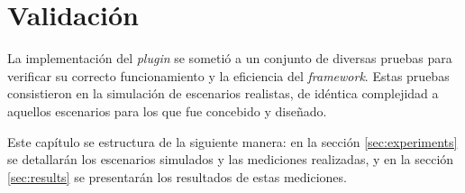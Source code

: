\chapter{Validación}\label{cap:validacion}

La implementación del \emph{plugin} se sometió a un conjunto de diversas pruebas para verificar su correcto funcionamiento y la eficiencia del \emph{framework}. Estas pruebas consistieron en la simulación de escenarios realistas, de idéntica complejidad a aquellos escenarios para los que fue concebido y diseñado. 

Este capítulo se estructura de la siguiente manera: en la sección \ref{sec:experiments} se detallarán los escenarios simulados y las mediciones realizadas, y en la sección \ref{sec:results} se presentarán los resultados de estas mediciones.


\newpage
